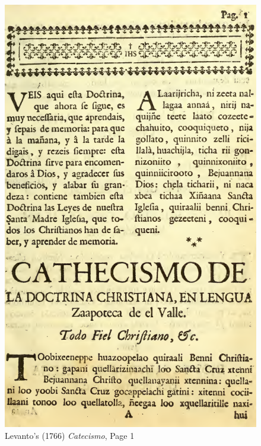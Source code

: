 \documentclass[12pt,a4paper]{article}
\begin{document}
\begin{figure}[h]
\centerline{\includegraphics[scale=0.4]{Levanto1766_Page1Full} }
\caption{Levanto's (1766) \emph{Catecismo}, Page 1}
\end{figure}
\end{document}
